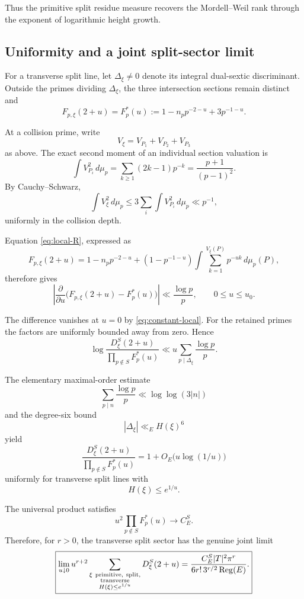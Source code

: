 \documentclass[11pt]{article}
\begin{document}
Thus the primitive split residue measure
recovers the Mordell--Weil rank through
the exponent of logarithmic height growth.

\subsection{Uniformity and a joint split-sector limit}

For a transverse split line, let
$\Delta_\xi\ne0$ denote its integral
dual-sextic discriminant.
Outside the primes dividing $\Delta_\xi$,
the three intersection sections remain
distinct and
\[
F_{p,\xi}(2+u)
=
F_p^*(u):=
1-n_pp^{-2-u}+3p^{-1-u}.
\]

At a collision prime, write
\[
V_\xi=V_{P_1}+V_{P_2}+V_{P_3}
\]
as above.
The exact second moment of an individual
section valuation is
\[
\int V_{P_i}^2\,d\mu_p
=
\sum_{k\ge1}(2k-1)p^{-k}
=
\frac{p+1}{(p-1)^2}.
\]
By Cauchy--Schwarz,
\[
\int V_\xi^2\,d\mu_p
\le3\sum_i\int V_{P_i}^2\,d\mu_p
\ll p^{-1},
\]
uniformly in the collision depth.

Equation \eqref{eq:local-R}, expressed as
\[
F_{p,\xi}(2+u)
=
1-n_pp^{-2-u}
+(1-p^{-1-u})
\int\sum_{k=1}^{V_\xi(P)}
p^{-uk}\,d\mu_p(P),
\]
therefore gives
\[
\left|
\frac{\partial}{\partial u}
\bigl(F_{p,\xi}(2+u)-F_p^*(u)\bigr)
\right|
\ll\frac{\log p}{p},
\qquad 0\le u\le u_0.
\]

The difference vanishes at $u=0$
by \eqref{eq:constant-local}.
For the retained primes the factors
are uniformly bounded away from zero.
Hence
\[
\log
\frac{D_\xi^S(2+u)}
{\prod_{p\notin S}F_p^*(u)}
\ll
u\sum_{p\mid\Delta_\xi}\frac{\log p}{p}.
\]

The elementary maximal-order estimate
\[
\sum_{p\mid n}\frac{\log p}{p}
\ll\log\log(3|n|)
\]
and the degree-six bound
\[
|\Delta_\xi|\ll_E H(\xi)^6
\]
yield
\begin{equation}\label{eq:uniform-ratio}
\boxed{
\frac{D_\xi^S(2+u)}
{\prod_{p\notin S}F_p^*(u)}
=
1+O_E\bigl(u\log(1/u)\bigr)
}
\end{equation}
uniformly for transverse split lines with
\[
H(\xi)\le e^{1/u}.
\]

The universal product satisfies
\[
u^2\prod_{p\notin S}F_p^*(u)
\longrightarrow C_E^S.
\]
Therefore, for $r>0$, the transverse
split sector has the genuine joint limit
\begin{equation}\label{eq:joint-limit}
\boxed{
\begin{aligned}
\lim_{u\downarrow0}
u^{r+2}
\sum_{\substack{\xi\ {\rm primitive,\ split,}\\
\text{transverse}\\H(\xi)\le e^{1/u}}}
D_\xi^S(2+u)
=
\frac{C_E^S|T|^2\pi^r}
{6r!\,3^{r/2}\operatorname{Reg}(E)}.
\end{aligned}
}
\end{equation}
\end{document}

